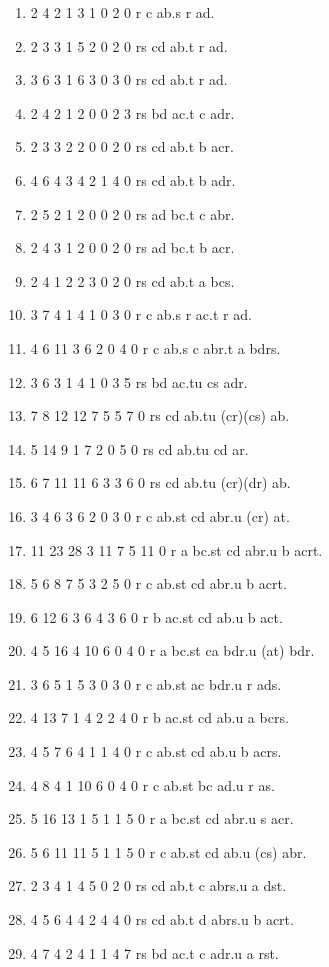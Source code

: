 \documentclass[10pt,journal]{IEEEtran}
\begin{document}
\begin{enumerate}
\item 2 4 2 1 3 1 0 2 0 r c ab.s r ad.
\item 2 3 3 1 5 2 0 2 0 rs cd ab.t r ad.
\item 3 6 3 1 6 3 0 3 0 rs cd ab.t r ad.
\item 2 4 2 1 2 0 0 2 3 rs bd ac.t c adr.
\item 2 3 3 2 2 0 0 2 0 rs cd ab.t b acr.
\item 4 6 4 3 4 2 1 4 0 rs cd ab.t b adr.
\item 2 5 2 1 2 0 0 2 0 rs ad bc.t c abr.
\item 2 4 3 1 2 0 0 2 0 rs ad bc.t b acr.
\item 2 4 1 2 2 3 0 2 0 rs cd ab.t a bcs.
\item 3 7 4 1 4 1 0 3 0 r c ab.s r ac.t r ad.
\item 4 6 11 3 6 2 0 4 0 r c ab.s c abr.t a bdrs.
\item 3 6 3 1 4 1 0 3 5 rs bd ac.tu cs adr.
\item 7 8 12 12 7 5 5 7 0 rs cd ab.tu (cr)(cs) ab.
\item 5 14 9 1 7 2 0 5 0 rs cd ab.tu cd ar.
\item 6 7 11 11 6 3 3 6 0 rs cd ab.tu (cr)(dr) ab.
\item 3 4 6 3 6 2 0 3 0 r c ab.st cd abr.u (cr) at.
\item 11 23 28 3 11 7 5 11 0 r a bc.st cd abr.u b acrt.
\item 5 6 8 7 5 3 2 5 0 r c ab.st cd abr.u b acrt.
\item 6 12 6 3 6 4 3 6 0 r b ac.st cd ab.u b act.
\item 4 5 16 4 10 6 0 4 0 r a bc.st ca bdr.u (at) bdr.
\item 3 6 5 1 5 3 0 3 0 r c ab.st ac bdr.u r ads.
\item 4 13 7 1 4 2 2 4 0 r b ac.st cd ab.u a bcrs.
\item 4 5 7 6 4 1 1 4 0 r c ab.st cd ab.u b acrs.
\item 4 8 4 1 10 6 0 4 0 r c ab.st bc ad.u r as.
\item 5 16 13 1 5 1 1 5 0 r a bc.st cd abr.u s acr.
\item 5 6 11 11 5 1 1 5 0 r c ab.st cd ab.u (cs) abr.
\item 2 3 4 1 4 5 0 2 0 rs cd ab.t c abrs.u a dst.
\item 4 5 6 4 4 2 4 4 0 rs cd ab.t d abrs.u b acrt.
\item 4 7 4 2 4 1 1 4 7 rs bd ac.t c adr.u a rst.

\end{enumerate}
\end{document}
